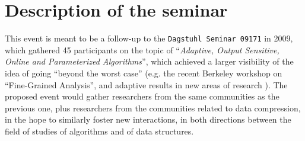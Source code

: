 \documentclass[a4paper,10pt]{article}
\begin{document}
% 
% 



\section{Description of the seminar}

\begin{INUTILE}
This event is meant to be a follow-up to the \texttt{Dagstuhl Seminar 09171} in 2009, which gathered 45 participants on the topic of ``\emph{Adaptive, Output Sensitive, Online and Parameterized Algorithms}'', which achieved a larger visibility of the idea of going ``beyond the worst case'' (e.g. the recent Berkeley workshop on ``Fine-Grained Analysis'', and adaptive results in new areas of research \cite{2015-SPIRE-AdaptiveComputationOfTheSwapInsertCorrectionDistance-BarbayPerez}). The proposed event would gather researchers from the same communities as the previous one, plus researchers from the communities related to data compression, in the hope to similarly foster new interactions, in both directions between the field of studies of algorithms and of data structures.
\end{INUTILE}
\end{document}
